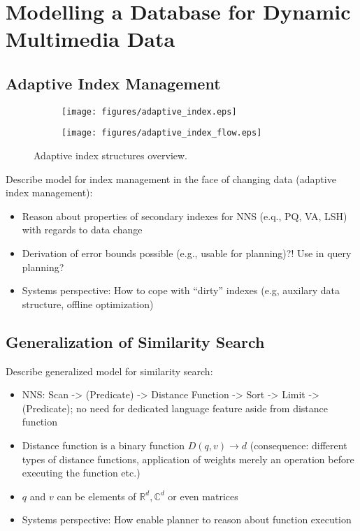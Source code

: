 \chapter{Modelling a Database for Dynamic Multimedia Data}
\label{chapter:system_model}


\section{Adaptive Index Management}

\begin{figure}[h!]
    \centering
    \begin{subfigure}[b]{0.40\textwidth}
        \centering
        \texttt{[image: figures/adaptive\_index.eps]}
        \label{figure:adaptive_index}
    \end{subfigure}
    \hfill
    \begin{subfigure}[b]{0.40\textwidth}
        \centering
        \texttt{[image: figures/adaptive\_index\_flow.eps]}
        \label{figure:adaptive_index:flow}
    \end{subfigure}
    \label{fig:adaptive_index}
    \caption{Adaptive index structures overview.}
\end{figure}

Describe model for index management in the face of changing data (adaptive index management):

\begin{itemize}
    \item Reason about properties of secondary indexes for NNS (e.q., PQ, VA, LSH) with regards to data change
    \item Derivation of error bounds possible (e.g., usable for planning)?! Use in query planning?
    \item Systems perspective: How to cope with ``dirty'' indexes (e.g, auxilary data structure, offline optimization)
\end{itemize}

\section{Generalization of Similarity Search}

Describe generalized model for similarity search:

\begin{itemize}
    \item NNS: Scan -> (Predicate) -> Distance Function -> Sort -> Limit -> (Predicate); no need for dedicated language feature aside from distance function
    \item Distance function is a binary function $D(q,v) \longrightarrow d$ (consequence: different types of distance functions, application of weights merely an operation before executing the function etc.)
    \item $q$ and $v$ can be elements of $\mathbb{R}^d,\mathbb{C}^d$ or even matrices
    \item Systems perspective: How enable planner to reason about function execution
\end{itemize}

